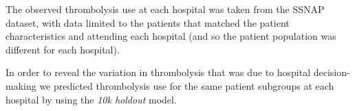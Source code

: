 The observed thrombolysis use at each hospital was taken from the SSNAP dataset, with data limited to the patients that matched the patient characteristics and attending each hospital (and so the patient population was different for each hospital).

In order to reveal the variation in thrombolysis that was due to hospital decision-making we predicted thrombolysis use for the same patient subgroups at each hospital by using the \emph{10k holdout} model.

